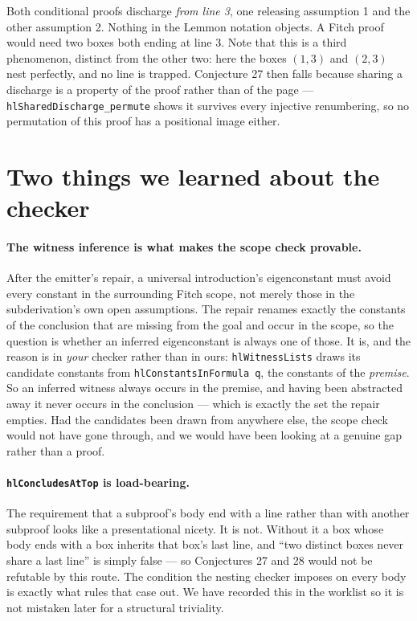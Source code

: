 \documentclass[11pt]{article}
\theoremstyle{plain}
\newcommand{\isa}[1]{\texttt{\small #1}}
\begin{document}
\noindent
Both conditional proofs discharge \emph{from line 3}, one releasing assumption
1 and the other assumption 2. Nothing in the Lemmon notation objects. A Fitch
proof would need two boxes both ending at line 3. Note that this is a third
phenomenon, distinct from the other two: here the boxes $(1,3)$ and $(2,3)$
nest perfectly, and no line is trapped. Conjecture 27 then falls because
sharing a discharge is a property of the proof rather than of the page ---
\isa{hlSharedDischarge\_permute} shows it survives every injective renumbering,
so no permutation of this proof has a positional image either.

\section{Two things we learned about the checker}

\paragraph{The witness inference is what makes the scope check provable.}
After the emitter's repair, a universal introduction's eigenconstant must avoid
every constant in the surrounding Fitch scope, not merely those in the
subderivation's own open assumptions. The repair renames exactly the constants
of the conclusion that are missing from the goal and occur in the scope, so the
question is whether an inferred eigenconstant is always one of those. It is,
and the reason is in \emph{your} checker rather than in ours:
\isa{hlWitnessLists} draws its candidate constants from
\isa{hlConstantsInFormula~q}, the constants of the \emph{premise}. So an
inferred witness always occurs in the premise, and having been abstracted away
it never occurs in the conclusion --- which is exactly the set the repair
empties. Had the candidates been drawn from anywhere else, the scope check
would not have gone through, and we would have been looking at a genuine gap
rather than a proof.

\paragraph{\isa{hlConcludesAtTop} is load-bearing.} The requirement that a
subproof's body end with a line rather than with another subproof looks like a
presentational nicety. It is not. Without it a box whose body ends with a box
inherits that box's last line, and ``two distinct boxes never share a last
line'' is simply false --- so Conjectures 27 and 28 would not be refutable by
this route. The condition the nesting checker imposes on every body is exactly
what rules that case out. We have recorded this in the worklist so it is not
mistaken later for a structural triviality.
\end{document}
